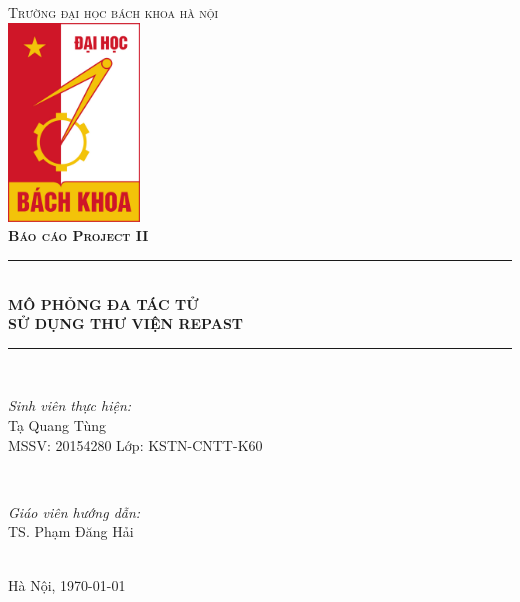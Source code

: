 \documentclass[../report.tex]{subfiles}
\begin{document}
\begin{titlepage}

\newcommand{\HRule}{\rule{\linewidth}{0.5mm}} %
\center
 
\textsc{\LARGE Trường đại học bách khoa hà nội}\\[1cm] %
\includegraphics[width=3.5cm]{figures/hust.jpg}\\[1cm] %
 
\textsc{\LARGE\bfseries Báo cáo Project II} \\[0.3cm]

\HRule \\[0.4cm]
{\LARGE\bfseries MÔ PHỎNG ĐA TÁC TỬ}\\[0.2cm] %
{\LARGE\bfseries SỬ DỤNG THƯ VIỆN REPAST}\\[0.3cm] %
\HRule \\[1.5cm]

\begin{minipage}{0.4\textwidth}
\begin{flushleft} \large
\emph{Sinh viên thực hiện:}\\
Tạ Quang Tùng \\ 
MSSV: 20154280
Lớp: KSTN-CNTT-K60
\end{flushleft}
\end{minipage}
~
\begin{minipage}{0.4\textwidth}
\begin{flushright} \large
\emph{Giáo viên hướng dẫn:} \\
TS. Phạm Đăng Hải
\end{flushright}
\end{minipage}\\[5cm]

{\large Hà Nội, \today}\\[1cm] %

\vfill %

\end{titlepage}
\end{document}
